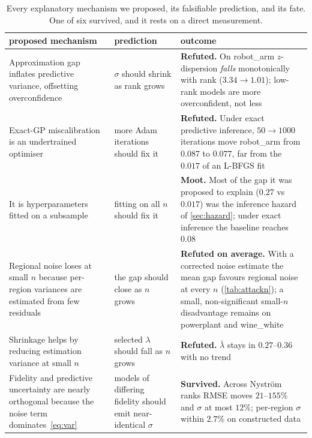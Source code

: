 \documentclass[11pt]{article}
\begin{document}
\begin{table}[!htbp]\centering
\caption{Every explanatory mechanism we proposed, its falsifiable prediction, and its
fate. One of six survived, and it rests on a direct measurement.}
\label{tab:mechanisms}
\small
\begin{tabular}{>{\raggedright\arraybackslash}p{4.2cm}>{\raggedright\arraybackslash}p{4.4cm}>{\raggedright\arraybackslash}p{4.6cm}}
\toprule
proposed mechanism & prediction & outcome \\
\midrule
Approximation gap inflates predictive variance, offsetting overconfidence &
$\sigma$ should shrink as rank grows &
\textbf{Refuted.} On robot\_arm $z$-dispersion \emph{falls} monotonically with rank
($3.34 \to 1.01$); low-rank models are more overconfident, not less \\
\addlinespace
Exact-GP miscalibration is an undertrained optimiser &
more Adam iterations should fix it &
\textbf{Refuted.} Under exact predictive inference, $50 \to 1000$ iterations move robot\_arm
from $0.087$ to $0.077$, far from the $0.017$ of an L-BFGS fit \\
\addlinespace
It is hyperparameters fitted on a subsample &
fitting on all $n$ should fix it &
\textbf{Moot.} Most of the gap it was proposed to explain ($0.27$ vs $0.017$) was the
inference hazard of \cref{sec:hazard}; under exact inference the baseline reaches
$0.08$ \\
\addlinespace
Regional noise loses at small $n$ because per-region variances are estimated from few
residuals & the gap should close as $n$ grows &
\textbf{Refuted on average.} With a corrected noise estimate the mean gap favours
regional noise at every $n$ (\cref{tab:attackn}); a small, non-significant small-$n$
disadvantage remains on powerplant and wine\_white \\
\addlinespace
Shrinkage helps by reducing estimation variance at small $n$ &
selected $\lambda$ should fall as $n$ grows &
\textbf{Refuted.} $\bar\lambda$ stays in $0.27$--$0.36$ with no trend \\
\addlinespace
Fidelity and predictive uncertainty are nearly orthogonal because the noise term
dominates~\cref{eq:var} &
models of differing fidelity should emit near-identical $\sigma$ &
\textbf{Survived.} Across Nystr\"om ranks RMSE moves $21$--$155\%$ and $\sigma$ at most
$12\%$; per-region $\sigma$ within $2.7\%$ on constructed data \\
\bottomrule
\end{tabular}
\end{table}
\end{document}
